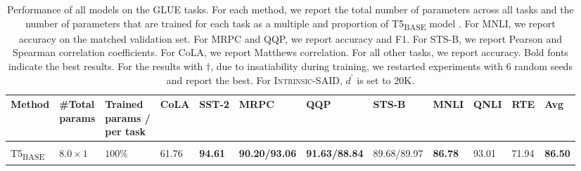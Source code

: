 \documentclass{article}
\newcommand{\basebase}{T5\textsubscript{\tiny BASE}\xspace}
\newcommand{\intrinsic}{\textsc{Intrinsic-SAID}\xspace}
\begin{document}
\begin{table}[tp]
\vspace{-1em}
\centering 
\caption{Performance of all models on the GLUE tasks. For each method, we report the total number of parameters across all tasks and the number of parameters that are trained for each task as a multiple and proportion of \basebase model \citep{raffel2019exploring}.
For MNLI, we report accuracy on the matched validation set. For MRPC and QQP, we report accuracy and F1. For STS-B, we report Pearson and Spearman correlation coefficients. For CoLA, we report Matthews correlation. For all other tasks, we report accuracy. Bold fonts indicate the best results. For the results with $\dagger$, due to insatiability during training, we restarted experiments with 6 random seeds and report the best. For \intrinsic, $d^{\prime}$ is set to $20$K.}
\begin{adjustbox}{max width=\textwidth}
\begin{tabular}{l@{\hskip 0.05in}|l@{\hskip 0.05in}l@{\hskip 0.01in}|l@{\hskip 0.1in}l@{\hskip 0.1in}l@{\hskip 0.1in}l@{\hskip 0.1in}l@{\hskip 0.1in}l@{\hskip 0.1in}l@{\hskip 0.1in}l|l}
\toprule %
\textbf{Method} & \pbox{3cm}{\textbf{\#Total}\\ \textbf{params}} & \pbox{3cm}{\textbf{Trained} \\ \textbf{params /}\\ \textbf{per task\vspace{0.1em}}} & \textbf{CoLA} &    \textbf{SST-2} &   \textbf{MRPC} &   \textbf{QQP} &     \textbf{STS-B} & \textbf{MNLI}  &    \textbf{QNLI} & \textbf{RTE} &   \textbf{Avg} \\
\toprule 
\rowcolor{gray!20}\multicolumn{12}{c}{\it \textbf{Baselines}}\\
\midrule 
\basebase &  $8.0\times1$ &   $100\%$ & 61.76 &  \textbf{94.61} &  \textbf{90.20/93.06} &  \textbf{91.63/88.84} &  89.68/89.97 &  \textbf{86.78} &  93.01 &  71.94 &  \textbf{86.50} \\ %
\midrule 


\end{tabular}
\end{adjustbox}
\end{table}
\end{document}
